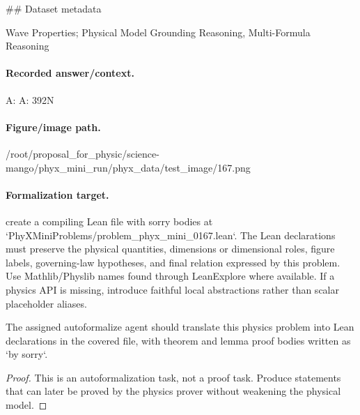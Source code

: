 \#\# Dataset metadata

Wave Properties; Physical Model Grounding Reasoning, Multi-Formula Reasoning

\paragraph{Recorded answer/context.}
A: A: 392N

\paragraph{Figure/image path.}
/root/proposal\_for\_physic/science-mango/phyx\_mini\_run/phyx\_data/test\_image/167.png

\paragraph{Formalization target.}
create a compiling Lean file with sorry bodies at `PhyXMiniProblems/problem\_phyx\_mini\_0167.lean`. The Lean declarations must preserve the physical quantities, dimensions or dimensional roles, figure labels, governing-law hypotheses, and final relation expressed by this problem.
Use Mathlib/Physlib names found through LeanExplore where available. If a physics API is missing, introduce faithful local abstractions rather than scalar placeholder aliases.

\begin{theorem}
\label{thm:physics:phyx_mini_0167:target}
The assigned autoformalize agent should translate this physics problem into Lean declarations in the covered file, with theorem and lemma proof bodies written as `by sorry`.
\end{theorem}
\begin{proof}
This is an autoformalization task, not a proof task. Produce statements that can later be proved by the physics prover without weakening the physical model.
\end{proof}

